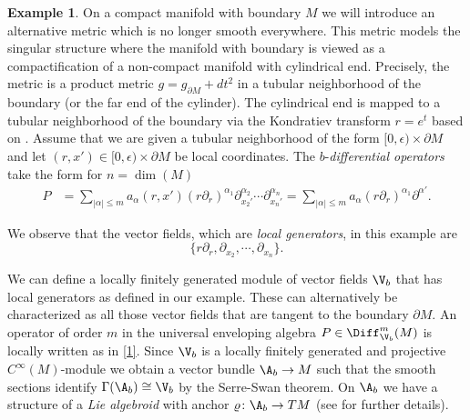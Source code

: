 \documentclass[10pt, reqno]{amsart}
\theoremstyle{definition}
\newtheorem{Exa}[Thm]{Example}
\begin{document}
\begin{Exa}
On a compact manifold with boundary $M$ we will introduce an alternative metric which is no longer smooth everywhere.
This metric models the singular structure where the manifold with boundary is viewed as a compactification
of a non-compact manifold with cylindrical end.
Precisely, the metric is a product metric $g = g_{\partial M} + dt^2$ in a tubular neighborhood of the boundary (or the far end of
the cylinder). 
The cylindrical end is mapped to a tubular neighborhood of the boundary via the Kondratiev transform $r = e^t$ based on \cite{Kon}. 
Assume that we are given a tubular neighborhood of the form $[0, \epsilon) \times \partial M$ and let $(r, x') \in [0,\epsilon) \times \partial M$
be local coordinates.
The $b$-\emph{differential operators} take the form for $n = \dim(M)$
\begin{align}
P &= \sum_{|\alpha| \leq m} a_{\alpha}(r, x') (r \partial_r)^{\alpha_1} \partial_{x_2'}^{\alpha_2} \cdots \partial_{x_n'}^{\alpha_n} = \sum_{|\alpha| \leq m} a_{\alpha} (r \partial_r)^{\alpha_1} \partial^{\alpha'}. \tag{$*$} \label{1}
\end{align}

We observe that the vector fields, which are \emph{local generators}, in this example are 
\[
\{r \partial_r, \partial_{x_2}, \cdots, \partial_{x_n}\}.
\] 

We can define a locally finitely generated module of vector fields $\V_b$ that has local generators as defined in our example.
These can alternatively be characterized as all those vector fields that are tangent
to the boundary $\partial M$. 
An operator of order $m$ in the universal enveloping algebra $P \in \Diff_{\V_b}^m(M)$ is locally written as in \eqref{1}. 
Since $\V_b$ is a locally finitely generated and projective $C^{\infty}(M)$-module we obtain a vector bundle $\A_b \to M$ such that the smooth sections identify $\Gamma(\A_b) \cong \V_b$ by the Serre-Swan theorem. On $\A_b$ we have a structure of a \emph{Lie algebroid} with anchor $\varrho \colon \A_b \to TM$ (see \cite{ALN} for further details).
\label{Exa:Kontradiev}
\end{Exa}
\end{document}
